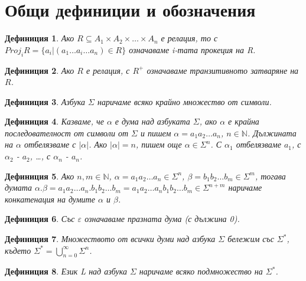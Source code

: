 \documentclass[a4paper,12pt]{article}
\newtheorem{defn}{Дефиниция}[section]
\begin{document}
\pagebreak

\section{Общи дефиниции и обозначения}

\begin{defn}
Ако $R \subseteq A_1 \times A_2 \times \ldots \times A_n$ е релация, то с $Proj_iR = \{a_i | (a_1 \ldots a_i \ldots a_n) \in R\}$ означаваме i-тата прокеция на R.
\end{defn}

\begin{defn}
Ако $R$ е релация, с $R^+$ означаваме транзитивното затваряне на $R$.
\end{defn}

\begin{defn}
Азбука $\Sigma$ наричаме всяко крайно множество от символи.
\end{defn}

\begin{defn}
Казваме, че $\alpha$ е дума над азбуката $\Sigma$, ако $\alpha$ е крайна последователност от символи от $\Sigma$ и пишем $\alpha = a_1 a_2 \ldots a_n$, $n \in \mathbb N$.
Дължината на $\alpha$ отбелязваме с $|\alpha|$. Ако $|\alpha| = n$, пишем още $\alpha \in \Sigma^n$.
С $\alpha_1$ отбелязваме $a_1$, с $\alpha_2$ - $a_2$, \ldots, с $\alpha_n$ - $a_n$.
\end{defn}

\begin{defn}
Ако $n, m \in \mathbb N$, $\alpha = a_1 a_2 \ldots a_n \in \Sigma^n$, $\beta = b_1 b_2 \ldots b_m \in \Sigma^m$, тогава думата
$\alpha . \beta = a_1 a_2 \ldots a_n . b_1 b_2 \ldots b_m = a_1 a_2 \ldots a_n b_1 b_2 \ldots b_m \in \Sigma^{n+m}$ наричаме конкатенация на думите $\alpha$ и $\beta$.
\end{defn}

\begin{defn}
Със $\varepsilon$ означаваме празната дума (с дължина 0).
\end{defn}

\begin{defn}
Множеството от всички думи над азбука $\Sigma$ бележим със $\Sigma^*$, където $\Sigma^* = \bigcup\limits_{n=0}^{\infty} \Sigma^n$.
\end{defn}

\begin{defn}
Език L над азбука $\Sigma$ наричаме всяко подмножество на $\Sigma^*$.
\end{defn}
\end{document}

